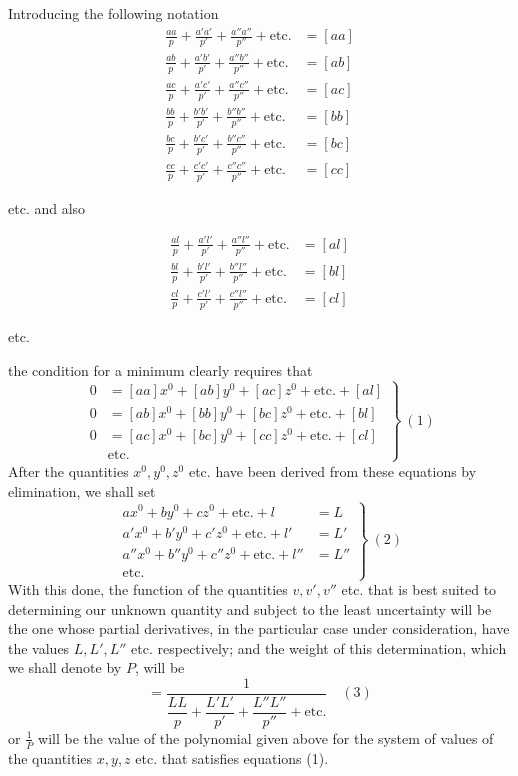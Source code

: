 Introducing the following notation
\[
\begin{aligned}
\frac{aa}{p}+\frac{a'a'}{p'}+\frac{a''a''}{p''}+\text{etc.}&=[aa]\\[4pt]
\frac{ab}{p}+\frac{a'b'}{p'}+\frac{a''b''}{p''}+\text{etc.}&=[ab]\\[4pt]
\frac{ac}{p}+\frac{a'c'}{p'}+\frac{a''c''}{p''}+\text{etc.}&=[ac]\\[4pt]
\frac{bb}{p}+\frac{b'b'}{p'}+\frac{b''b''}{p''}+\text{etc.}&=[bb]\\[4pt]
\frac{bc}{p}+\frac{b'c'}{p'}+\frac{b''c''}{p''}+\text{etc.}&=[bc]\\[4pt]
\frac{cc}{p}+\frac{c'c'}{p'}+\frac{c''c''}{p''}+\text{etc.}&=[cc]
\end{aligned}
\]
\begin{center}etc. and also\end{center}
\[
\begin{aligned}
\frac{al}{p}+\frac{a'l'}{p'}+\frac{a''l''}{p''}+\text{etc.}&=[al]\\[4pt]
\frac{bl}{p}+\frac{b'l'}{p'}+\frac{b''l''}{p''}+\text{etc.}&=[bl]\\[4pt]
\frac{cl}{p}+\frac{c'l'}{p'}+\frac{c''l''}{p''}+\text{etc.}&=[cl]
\end{aligned}
\]
\begin{center}etc.\end{center}
the condition for a minimum clearly requires that
\[
\left.\begin{aligned}
0&=[aa]x^0+[ab]y^0+[ac]z^0+\text{etc.}+[al]\\
0&=[ab]x^0+[bb]y^0+[bc]z^0+\text{etc.}+[bl]\\
0&=[ac]x^0+[bc]y^0+[cc]z^0+\text{etc.}+[cl]\\
&\text{etc.}
\end{aligned}\right\}\ (1)
\]
After the quantities \(x^0,y^0,z^0\) etc. have been derived from these equations by elimination, we shall set
\[
\left.\begin{aligned}
ax^0+by^0+cz^0+\text{etc.}+l&=L\\
a'x^0+b'y^0+c'z^0+\text{etc.}+l'&=L'\\
a''x^0+b''y^0+c''z^0+\text{etc.}+l''&=L''\\
\text{etc.}\quad&
\end{aligned}\right\}\ (2)
\]
With this done, the function of the quantities \(v,v',v''\) etc. that is best suited to determining our unknown quantity and subject to the least uncertainty will be the one whose partial derivatives, in the particular case under consideration, have the values \(L,L',L''\) etc. respectively; and the weight of this determination, which we shall denote by \(P\), will be
\[
=\frac{1}{\dfrac{LL}{p}+\dfrac{L'L'}{p'}+\dfrac{L''L''}{p''}+\text{etc.}}\quad(3)
\]
or \(\frac1P\) will be the value of the polynomial given above for the system of values of the quantities \(x,y,z\) etc. that satisfies equations (1).

